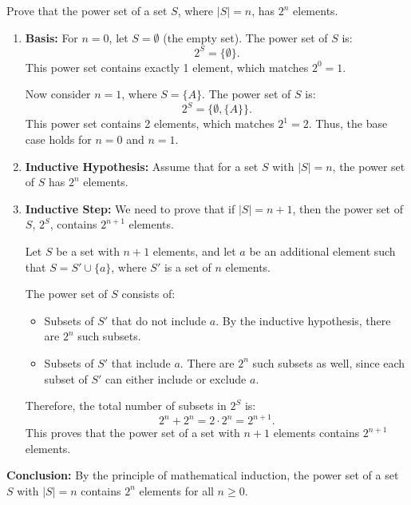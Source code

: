     \begin{example}
        Prove that the power set of a set \( S \), where \( |S| = n \), has \( 2^n \) elements.

        \begin{enumerate}
            \item \textbf{Basis:} 
            For \( n = 0 \), let \( S = \emptyset \) (the empty set). The power set of \( S \) is:
            \[
            2^S = \{\emptyset\}.
            \]
            This power set contains exactly 1 element, which matches \( 2^0 = 1 \). 
            
            Now consider \( n = 1 \), where \( S = \{A\} \). The power set of \( S \) is:
            \[
            2^S = \{\emptyset, \{A\}\}.
            \]
            This power set contains 2 elements, which matches \( 2^1 = 2 \). Thus, the base case holds for \( n = 0 \) and \( n = 1 \).

            \item \textbf{Inductive Hypothesis:} 
            Assume that for a set \( S \) with \( |S| = n \), the power set of \( S \) has \( 2^n \) elements. 
            
            \item \textbf{Inductive Step:} 
            We need to prove that if \( |S| = n+1 \), then the power set of \( S \), \( 2^S \), contains \( 2^{n+1} \) elements.
            \vspace{1em}

            Let \( S \) be a set with \( n+1 \) elements, and let \( a \) be an additional element such that \( S = S' \cup \{a\} \), where \( S' \) is a set of \( n \) elements. 
            
            \vspace{1em}
            The power set of \( S \) consists of:
            \begin{itemize}
                \item Subsets of \( S' \) that do not include \( a \). By the inductive hypothesis, there are \( 2^n \) such subsets.
                \item Subsets of \( S' \) that include \( a \). There are \( 2^n \) such subsets as well, since each subset of \( S' \) can either include or exclude \( a \).
            \end{itemize}
            
            Therefore, the total number of subsets in \( 2^S \) is:
            \[
            2^n + 2^n = 2 \cdot 2^n = 2^{n+1}.
            \]
            This proves that the power set of a set with \( n+1 \) elements contains \( 2^{n+1} \) elements.
            
        \end{enumerate}

        \textbf{Conclusion:} By the principle of mathematical induction, the power set of a set \( S \) with \( |S| = n \) contains \( 2^n \) elements for all \( n \geq 0 \).
    \end{example}

